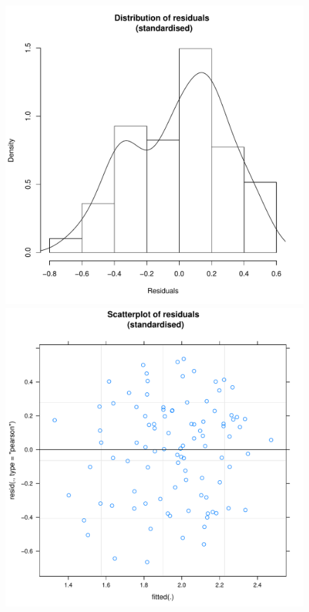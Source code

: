 \begin{CJK}{UTF8}{gbsn}
            \begin{figure}[!htbp]
              \includegraphics[scale =.4]{images/MLM3aLogHist.pdf}
              \includegraphics[scale =.4]{images/MLM3aLogScatter.pdf}

\end{figure}
\end{CJK}
